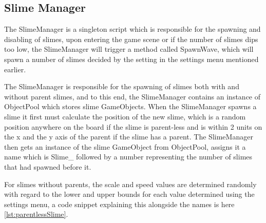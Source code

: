 \subsection{Slime Manager}
The SlimeManager is a singleton script which is responsible for the spawning and disabling of slimes, upon entering the game scene or if the number of slimes dips too low, the SlimeManager will trigger a method called SpawnWave, which will spawn a number of slimes decided by the setting in the settings menu mentioned earlier.
\par
The SlimeManager is responsible for the spawning of slimes both with and without parent slimes, and to this end, the SlimeManager contains an instance of ObjectPool which stores slime GameObjects. When the SlimeManager spawns a slime it first must calculate the position of the new slime, which is a random position anywhere on the board if the slime is parent-less and is within 2 units on the x and the y axis of the parent if the slime has a parent. The SlimeManager then gets an instance of the slime GameObject from ObjectPool, assigns it a name which is Slime\_ followed by a number representing the number of slimes that had spawned before it. 
\par
For slimes without parents, the scale and speed values are determined randomly with regard to the lower and upper bounds for each value determined using the settings menu, a code snippet explaining this alongside the names is here \ref{lst:parentlessSlime}. 

